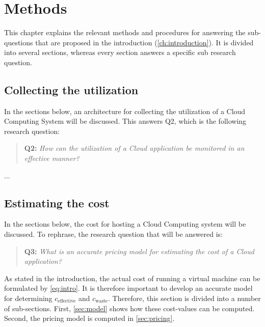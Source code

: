 \chapter{Methods}\label{ch:methods}
This chapter explains the relevant methods and procedures for answering the sub-questions that are proposed in the introduction (\autoref{ch:introduction}). It is divided into several sections, whereas every section answers a specific sub research question.

\section{Collecting the utilization} \label{sec:collect_utilization}
In the sections below, an architecture for collecting the utilization of a Cloud Computing System will be discussed. This answers Q2, which is the following research question:

\begin{quote}
	\textbf{Q2: }\textit{How can the utilization of a Cloud application be monitored in an effective manner?}\\
\end{quote}

...

\section{Estimating the cost} \label{sec:cost}
In the sections below, the cost for hosting a Cloud Computing system will be discussed. To rephrase, the research question that will be answered is:

\begin{quote}
	\textbf{Q3: }\textit{What is an accurate pricing model for estimating the cost of a Cloud application?}\\
\end{quote}

As stated in the introduction, the actual cost of running a virtual machine can be formulated by \autoref{eq:intro}. It is therefore important to develop an accurate model for determining $c_\text{effective}$ and $c_\text{waste}$. Therefore, this section is divided into a number of sub-sections. First, \autoref{sec:model} shows how these cost-values can be computed. Second, the pricing model is computed in \autoref{sec:pricing}.

